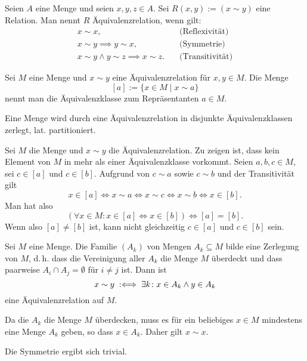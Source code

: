 \begin{Definition}[Äquivalenzrelation]\newlinefirst
Seien $A$ eine Menge und seien $x,y,z\in A$. Sei $R(x,y):=(x\sim y)$ eine
Relation. Man nennt $R$ Äquivalenzrelation, wenn gilt:
\[\begin{array}{ll}
x\sim x, &\text{(Reflexivität)}\\
x\sim y \implies y\sim x, & \text{(Symmetrie)}\\
x\sim y\land y\sim z\implies x\sim z.\quad & \text{(Transitivität)}
\end{array}\]
\end{Definition}

\begin{Definition}[Äquivalenzklasse]\newlinefirst
Sei $M$ eine Menge und $x\sim y$ eine Äquivalenzrelation für $x,y\in M$.
Die Menge%
\[[a] := \{x\in M\mid x\sim a\}\]
nennt man die Äquivalenzklasse zum Repräsentanten $a\in M$.
\end{Definition}

\begin{Satz}\newlinefirst
Eine Menge wird durch eine Äquivalenzrelation in disjunkte
Äquivalenzklassen zerlegt, lat. partitioniert.
\end{Satz}
 Sei $M$ die Menge und $x\sim y$ die Äquivalenzrelation.
Zu zeigen ist, dass kein Element von $M$ in mehr als einer
Äquivalenzklasse vorkommt. Seien $a,b,c\in M$, sei $c\in [a]$
und $c\in [b]$. Aufgrund von $c\sim a$ sowie $c\sim b$ und der
Transitivität gilt%
\[x\in [a]\iff x\sim a\iff x\sim c\iff x\sim b\iff x\in [b].\]
Man hat also
\[(\forall x\in M\colon x\in [a]\Leftrightarrow x\in [b])\iff [a]=[b].\]
Wenn also $[a]\ne [b]$ ist, kann nicht gleichzeitig $c\in [a]$ und $c\in [b]$
sein.\;\qedsymbol

\begin{Satz}\newlinefirst
Sei $M$ eine Menge. Die Familie $(A_k)$ von Mengen $A_k\subseteq M$
bilde eine Zerlegung von $M$, d.\,h. dass die Vereinigung aller
$A_k$ die Menge $M$ überdeckt und dass paarweise $A_i\cap A_j=\emptyset$
für $i\ne j$ ist. Dann ist%
\[x\sim y\;:\Longleftrightarrow\; \exists k\colon x\in A_k\land y\in A_k\]
eine Äquivalenzrelation auf $M$.
\end{Satz}
 Da die $A_k$ die Menge $M$ überdecken,
muss es für ein beliebiges $x\in M$ mindestens eine Menge $A_k$
geben, so dass $x\in A_k$. Daher gilt $x\sim x$.

Die Symmetrie ergibt sich trivial.

